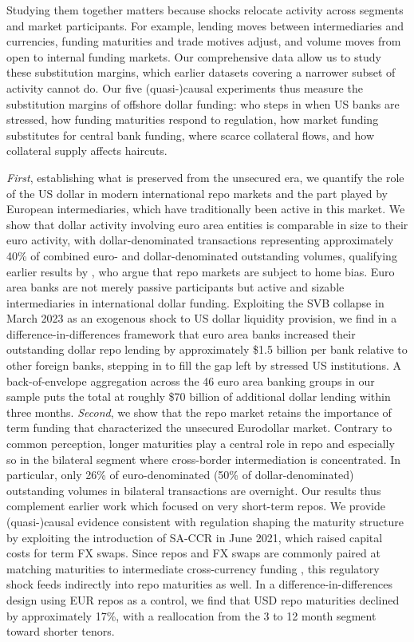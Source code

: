 \documentclass[english, 12pt, oneside]{article}
\begin{document}
Studying them together matters because shocks relocate activity across segments and market participants. For example, lending moves between intermediaries and currencies, funding maturities and trade motives adjust, and volume moves from open to internal funding markets. Our comprehensive data allow us to study these substitution margins, which earlier datasets covering a narrower subset of activity cannot do.
Our five (quasi-)causal experiments thus measure the substitution margins of offshore dollar funding: who steps in when US banks are stressed, how funding maturities respond to regulation, how market funding substitutes for central bank funding, where scarce collateral flows, and how collateral supply affects haircuts.

\emph{First}, establishing what is preserved from the unsecured era, we quantify the role of the US dollar in modern international repo markets and the part played by European intermediaries, which have traditionally been active in this market.
We show that dollar activity involving euro area entities is comparable in size to their euro activity, with dollar-denominated transactions representing approximately 40\% of combined euro- and dollar-denominated outstanding volumes, qualifying earlier results by \citet{schaffner2019}, who argue that repo markets are subject to home bias.
Euro area banks are not merely passive participants but active and sizable intermediaries in international dollar funding. Exploiting the SVB collapse in March 2023 as an exogenous shock to US dollar liquidity provision, we find in a difference-in-differences framework that euro area banks increased their outstanding dollar repo lending by approximately \$1.5 billion per bank relative to other foreign banks, stepping in to fill the gap left by stressed US institutions.
A back-of-envelope aggregation across the 46 euro area banking groups in our sample puts the total at roughly \$70 billion of additional dollar lending within three months.
\emph{Second}, we show that the repo market retains the importance of term funding that characterized the unsecured Eurodollar market. Contrary to common perception, longer maturities play  a central role in repo and  especially so in the bilateral segment where cross-border intermediation is concentrated.  In particular, only 26\%  of euro-denominated (50\% of dollar-denominated) outstanding volumes in bilateral transactions are overnight. Our results thus complement earlier work \citep[e.g.,][]{mancini2016, bechtel2023, huser2024} which focused on very short-term repos. 
We provide (quasi-)causal evidence consistent with regulation shaping the maturity structure by exploiting the introduction of SA-CCR in June 2021, which raised capital costs for term FX swaps. Since repos and FX swaps are commonly paired at matching maturities to intermediate cross-currency funding \citep{du2025, kloks2024}, this regulatory shock feeds indirectly into repo maturities as well. In a difference-in-differences design using EUR repos as a control, we find that USD repo maturities declined by approximately 17\%, with a reallocation from the 3 to 12 month segment toward shorter tenors.
\end{document}
